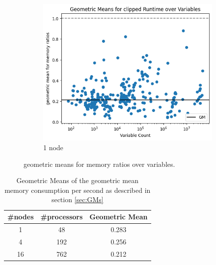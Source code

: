 \documentclass[12pt,a4paper,twoside]{scrartcl}
\numberwithin{equation}{section}
\begin{document}
\begin{figure}
\begin{subfigure}[c]{.4\textwidth}
    \center
    \includegraphics[scale=.3]{plots/16node_compare/mem_gm_over_vars.png}
    \caption{1 node}
  \end{subfigure}
  \caption{geometric means for memory ratios over variables.}
  \label{fig:memGmVars}
\end{figure}

\begin{table}
  \center
  \begin{tabular}{ ccc }
    \toprule
    \#nodes & \#processors & Geometric Mean \\
    \midrule
    1  & 48  & 0.283\\
    4  & 192 & 0.256\\
    16 & 762 & 0.212\\
    \bottomrule
  \end{tabular}
  \caption{Geometric Means of the geometric mean memory consumption per second as described in section \ref{sec:GMs}}
  \label{tab:memGM}
\end{table}
\end{document}
